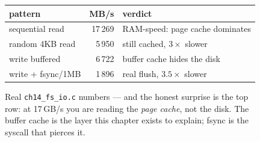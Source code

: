 \begin{figure}[htbp]
\centering
\begin{tabular}{lrl}
\toprule
pattern & MB/s & verdict \\
\midrule
sequential read & 17\,269 & RAM-speed: page cache dominates \\
random 4KB read & 5\,950 & still cached, $3\times$ slower \\
write buffered & 6\,722 & buffer cache hides the disk \\
write + fsync/1MB & 1\,896 & real flush, $3.5\times$ slower \\
\bottomrule
\end{tabular}
\caption{Real \texttt{ch14\_fs\_io.c} numbers --- and the honest
surprise is the top row: at 17\,GB/s you are reading the
\emph{page cache}, not the disk. The buffer cache is the layer this
chapter exists to explain; fsync is the syscall that pierces it.}
\label{fig:seqrand14}
\end{figure}
